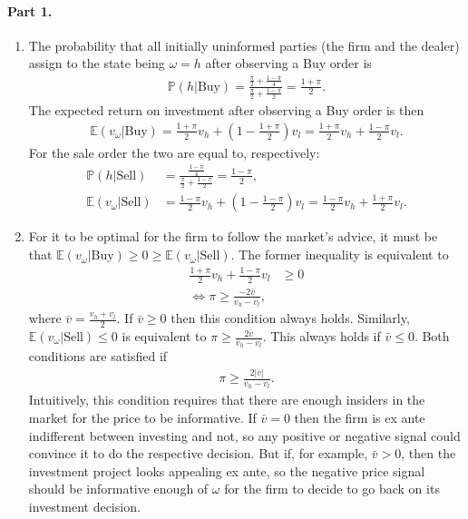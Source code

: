 \begin{solution}
	\paragraph{Part 1.}
	\begin{enumerate}[label=(\alph{enumi})]
		\item 
		The probability that all initially uninformed parties (the firm and the dealer) assign to the state being $\omega = h$ after observing a Buy order is
		\begin{align*}
			\mathbb{P}(h | \text{Buy}) = \frac{\frac{\pi}{2} + \frac{1-\pi}{4}}{\frac{\pi}{2} + \frac{1-\pi}{2}} = \frac{1 + \pi}{2}.
		\end{align*}
		The expected return on investment after observing a Buy order is then
		\begin{align*}
			\mathbb{E}(v_\omega | \text{Buy} ) = \frac{1+\pi}{2} v_h + \left(1 - \frac{1+\pi}{2} \right) v_l = \frac{1+\pi}{2} v_h + \frac{1-\pi}{2} v_l.
		\end{align*}
		For the sale order the two are equal to, respectively:
		\begin{align*}
			\mathbb{P}(h | \text{Sell}) &= \frac{\frac{1-\pi}{4}}{\frac{\pi}{2} + \frac{1-\pi}{2}} = \frac{1 - \pi}{2},
			\\
			\mathbb{E}(v_\omega | \text{Sell} ) &= \frac{1-\pi}{2} v_h + \left(1 - \frac{1-\pi}{2} \right) v_l = \frac{1-\pi}{2} v_h + \frac{1+\pi}{2} v_l.
		\end{align*}
	
		\item
		For it to be optimal for the firm to follow the market's advice, it must be that $\mathbb{E}(v_\omega | \text{Buy} ) \geq 0 \geq \mathbb{E}(v_\omega | \text{Sell} )$.
		The former inequality is equivalent to
		\begin{align*}
			\frac{1+\pi}{2} v_h + \frac{1-\pi}{2} v_l &\geq 0
			\\
			\iff
			\pi \geq \frac{-2 \bar{v}}{v_h - v_l},
		\end{align*}
		where $\bar{v} = \frac{v_h+v_l}{2}$. If $\bar{v} \geq 0$ then this condition always holds.
		Similarly, $\mathbb{E}(v_\omega | \text{Sell} ) \leq 0$ is equivalent to $\pi \geq \frac{2 \bar{v}}{v_h - v_l}$. This always holds if $\bar{v} \leq 0$. 
		Both conditions are satisfied if
		\begin{align}
			\pi \geq \frac{2 |\bar{v}|}{v_h - v_l}.
			\tag{$\star$}
			\label{eq:fbexist}
		\end{align}
		Intuitively, this condition requires that there are enough insiders in the market for the price to be informative. If $\bar{v}=0$ then the firm is ex ante indifferent between investing and not, so any positive or negative signal could convince it to do the respective decision. But if, for example, $\bar{v} > 0$, then the investment project looks appealing ex ante, so the negative price signal should be informative enough of $\omega$ for the firm to decide to go back on its investment decision.
		

\end{enumerate}
\end{solution}
